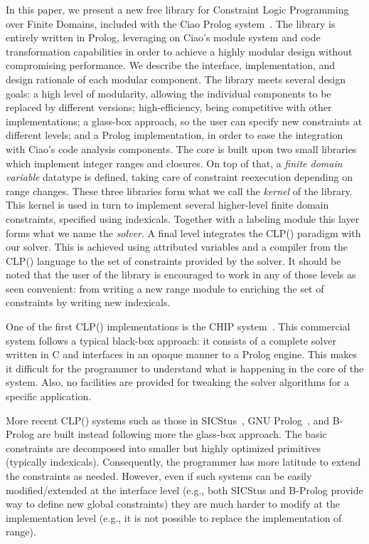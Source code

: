 \documentclass{llncs}
\newcommand{\clpfd}{CLP()\xspace}
\newcommand{\fd}{\xspace}
\begin{document}
In this paper, we present a new free library for Constraint Logic
Programming over Finite Domains, included with the Ciao Prolog
system~\cite{hermenegildo11:ciao-design-tplp}.
The library is entirely written in Prolog, leveraging on Ciao's
  module system and code transformation capabilities in order to
  achieve a highly modular design without compromising performance.
  We describe the interface, implementation, and design rationale of
  each modular component.
The library meets several design goals: a high level of modularity,
  allowing the individual components to be replaced by different
  versions; high-efficiency, being competitive with other \fd
  implementations; a glass-box approach, so the user can specify new
  constraints at different levels; and a Prolog implementation, in order
  to ease the integration with Ciao's code analysis components.
The core is built upon two small libraries which implement integer
  ranges and closures. On top of that, a \emph{finite domain variable}
  datatype is defined, taking care of constraint reexecution depending
  on range changes. These three libraries form what we call the
  \emph{\fd kernel} of the library.
This \fd kernel is used in turn to implement several higher-level
  finite domain constraints, specified using indexicals. Together with
  a labeling module this layer forms what we name the \emph{\fd
    solver}.
A final level integrates the \clpfd paradigm with
  our \fd solver. This is achieved using attributed variables and a
  compiler from the \clpfd language to the set of constraints
  provided by the solver.
It should be noted that the user of the library is encouraged to
  work in any of those levels as seen convenient: from writing a
  new range module to enriching the set of \fd constraints by writing
  new indexicals.

\medskip

One of the first \clpfd implementations is the CHIP
system~\cite{chip}.  This commercial system follows a typical
black-box approach: it consists of a complete solver written in C and
interfaces in an opaque manner to a Prolog engine. This makes it
difficult for the programmer to understand what is happening in the
core of the system. Also, no facilities are provided for tweaking the
solver algorithms for a specific application.

More recent \clpfd systems such as those in
SICStus~\cite{Carlsson:1997:OFD:646452.692956}, GNU
Prolog~\cite{diaz11:gnu_prolog,clpfd}, and B-Prolog
\cite{Zhou:2006:PFC:1180162.1180163} are built instead following more
the glass-box approach. The basic constraints are decomposed into
smaller but highly optimized primitives (typically indexicals).
Consequently, the programmer has more latitude to extend the
constraints as needed. However, even if such systems can be easily
modified/extended at the interface level (e.g., both SICStus and
B-Prolog provide way to define new global constraints) they are much
harder to modify at the implementation level (e.g., it is not possible
to replace the implementation of range).
\end{document}
